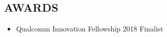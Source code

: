 \documentclass[10pt, letterpaper]{article}
\makeatletter
\newcommand{\headerrow}[2]
{\begin{tabular*}{\linewidth}{l@{\extracolsep{\fill}}r}
	#1 &
	#2 \\
\end{tabular*}}
\newcommand{\sansserif}{\cabin}
\makeatother
\begin{document}
	\begin{comment}
\headerrow
	{\uline{Taylor Center Tutor} \textit{(UMN)}}
	{September 2013 - December 2014}
	\begin{itemize}	
		\item Tutored freshmen in Physics I \& II, Calculus I, II, \& III, and Linear Algebra at Frontier Residence Hall
	\end{itemize}
	\end{comment}
	


\subsection*{\sansserif AWARDS}

\begin{itemize}
	\item Qualcomm Innovation Fellowship 2018 Finalist
\end{itemize}
\end{document}
